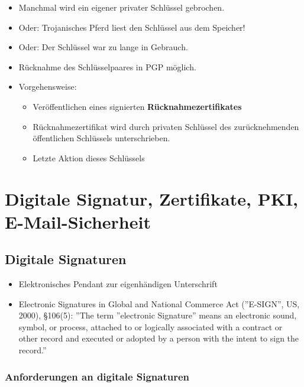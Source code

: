 \documentclass[openany]{book}
\begin{document}
\begin{itemize}
    \item Manchmal wird ein eigener privater Schlüssel gebrochen.
    \item Oder: Trojanisches Pferd liest den Schlüssel aus dem Speicher!
    \item Oder: Der Schlüssel war zu lange in Gebrauch. \\ 
    \item Rücknahme des Schlüsselpaares in PGP möglich. \\ 
    \item Vorgehensweise:
    \begin{itemize}
        \item Veröffentlichen eines signierten \textbf{Rücknahmezertifikates}
        \item Rücknahmezertifikat wird durch privaten Schlüssel des zurücknehmenden öffentlichen Schlüssels unterschrieben.
        \item Letzte Aktion dieses Schlüssels
    \end{itemize}
\end{itemize}

\chapter{Digitale Signatur, Zertifikate, PKI, E-Mail-Sicherheit}

\section{Digitale Signaturen}

\begin{itemize}
    \item Elektronisches Pendant zur eigenhändigen Unterschrift
    \item Electronic Signatures in Global and National Commerce Act (''E-SIGN'', US, 2000), §106(5): ''The term ''electronic Signature'' means an electronic sound, symbol, or process, attached to or logically associated with a contract or other record and executed or adopted by a person with the intent to sign the record.''
\end{itemize}

\subsection{Anforderungen an digitale Signaturen}
\end{document}
